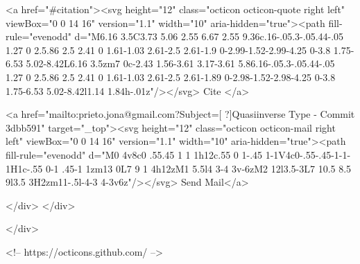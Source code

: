       <a  href="#citation"><svg height="12" class="octicon octicon-quote right left" viewBox="0 0 14 16" version="1.1" width="10" aria-hidden="true"><path fill-rule="evenodd" d="M6.16 3.5C3.73 5.06 2.55 6.67 2.55 9.36c.16-.05.3-.05.44-.05 1.27 0 2.5.86 2.5 2.41 0 1.61-1.03 2.61-2.5 2.61-1.9 0-2.99-1.52-2.99-4.25 0-3.8 1.75-6.53 5.02-8.42L6.16 3.5zm7 0c-2.43 1.56-3.61 3.17-3.61 5.86.16-.05.3-.05.44-.05 1.27 0 2.5.86 2.5 2.41 0 1.61-1.03 2.61-2.5 2.61-1.89 0-2.98-1.52-2.98-4.25 0-3.8 1.75-6.53 5.02-8.42l1.14 1.84h-.01z"/></svg> Cite
      </a>

      <a href="mailto:prieto.jona@gmail.com?Subject=[ ?]Quasiinverse Type - Commit 3dbb591" target="_top"><svg height="12" class="octicon octicon-mail right left" viewBox="0 0 14 16" version="1.1" width="10" aria-hidden="true"><path fill-rule="evenodd" d="M0 4v8c0 .55.45 1 1 1h12c.55 0 1-.45 1-1V4c0-.55-.45-1-1-1H1c-.55 0-1 .45-1 1zm13 0L7 9 1 4h12zM1 5.5l4 3-4 3v-6zM2 12l3.5-3L7 10.5 8.5 9l3.5 3H2zm11-.5l-4-3 4-3v6z"/></svg> Send Mail</a>

    </div>
  </div>

</div>

<!-- https://octicons.github.com/ -->





